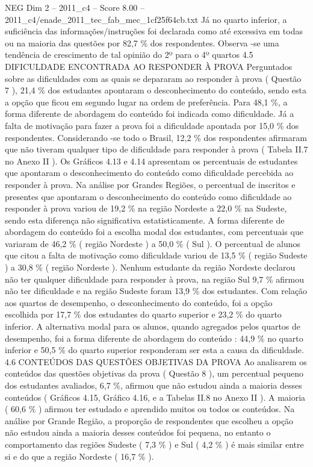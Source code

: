 \begin{textsample}{NEG Dim 2 – 2011\_c4 – Score 8.00 – 2011\_c4/enade\_2011\_tec\_fab\_mec\_1cf25f64cb.txt}
Já no quarto inferior, a suficiência das informações/instruções foi declarada como até excessiva em todas ou na maioria das questões por 82,7 \% dos respondentes.
Observa -se uma tendência de crescimento de tal opinião do 2º para o 4º quartos 4.5 DIFICULDADE ENCONTRADA AO RESPONDER À PROVA Perguntados sobre as dificuldades com as quais se depararam ao responder à prova ( Questão 7 ), 21,4 \% dos estudantes apontaram o desconhecimento do conteúdo, sendo esta a opção que ficou em segundo lugar na ordem de preferência.
Para 48,1 \%, a forma diferente de abordagem do conteúdo foi indicada como dificuldade.
Já a falta de motivação para fazer a prova foi a dificuldade apontada por 15,0 \% dos respondentes.
Considerando -se todo o Brasil, 12,2 \% dos respondentes afirmaram que não tiveram qualquer tipo de dificuldade para responder à prova ( Tabela II.7 no Anexo II ).
Os Gráficos 4.13 e 4.14 apresentam os percentuais de estudantes que apontaram o desconhecimento do conteúdo como dificuldade percebida ao responder à prova.
Na análise por Grandes Regiões, o percentual de inscritos e presentes que apontaram o desconhecimento do conteúdo como dificuldade ao responder à prova variou de 19,2 \% na região Nordeste a 22,0 \% na Sudeste, sendo esta diferença não significativa estatisticamente.
A forma diferente de abordagem do conteúdo foi a escolha modal dos estudantes, com percentuais que variaram de 46,2 \% ( região Nordeste ) a 50,0 \% ( Sul ).
O percentual de alunos que citou a falta de motivação como dificuldade variou de 13,5 \% ( região Sudeste ) a 30,8 \% ( região Nordeste ).
Nenhum estudante da região Nordeste declarou não ter qualquer dificuldade para responder à prova, na região Sul 9,7 \% afirmou não ter dificuldade e na região Sudeste foram 13,9 \% dos estudantes.
Com relação aos quartos de desempenho, o desconhecimento do conteúdo, foi a opção escolhida por 17,7 \% dos estudantes do quarto superior e 23,2 \% do quarto inferior.
A alternativa modal para os alunos, quando agregados pelos quartos de desempenho, foi a forma diferente de abordagem do conteúdo : 44,9 \% no quarto inferior e 50,5 \% do quarto superior responderam ser esta a causa da dificuldade. 4.6 CONTEÚDOS DAS QUESTÕES OBJETIVAS DA PROVA Ao analisarem os conteúdos das questões objetivas da prova ( Questão 8 ), um percentual pequeno dos estudantes avaliados, 6,7 \%, afirmou que não estudou ainda a maioria desses conteúdos ( Gráficos 4.15, Gráfico 4.16, e a Tabelas II.8 no Anexo II ).
A maioria ( 60,6 \% ) afirmou ter estudado e aprendido muitos ou todos os conteúdos.
Na análise por Grande Região, a proporção de respondentes que escolheu a opção não estudou ainda a maioria desses conteúdos foi pequena, no entanto o comportamento das regiões Sudeste ( 7,3 \% ) e Sul ( 4,2 \% ) é mais similar entre si e do que a região Nordeste ( 16,7 \% ).

\end{textsample}
